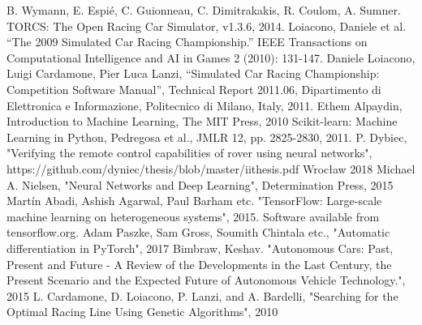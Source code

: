 \documentclass[declaration,shortabstract,english,inz]{iithesis}
\begin{document}
\begin{thebibliography}{1}
 B. Wymann, E. Espié, C. Guionneau, C. Dimitrakakis, R. Coulom, A. Sumner. TORCS: The Open Racing Car Simulator, v1.3.6, 2014.
 Loiacono, Daniele et al. “The 2009 Simulated Car Racing Championship.” IEEE Transactions on Computational Intelligence and AI in Games 2 (2010): 131-147.
 Daniele Loiacono, Luigi Cardamone, Pier Luca Lanzi, “Simulated Car
Racing Championship: Competition Software Manual”, Technical Report 2011.06, Dipartimento
di Elettronica e Informazione, Politecnico di Milano, Italy, 2011.
 Ethem Alpaydin, Introduction to Machine Learning, The MIT Press, 2010
 Scikit-learn: Machine Learning in Python, Pedregosa et al., JMLR 12, pp. 2825-2830, 2011.
 P. Dybiec, "Verifying the remote control capabilities of rover using neural networks", https://github.com/dyniec/thesis/blob/master/iithesis.pdf Wrocław 2018
 Michael A. Nielsen, "Neural Networks and Deep Learning", Determination Press, 2015
 Martín Abadi, Ashish Agarwal, Paul Barham etc.
"TensorFlow: Large-scale machine learning on heterogeneous systems",
2015. Software available from tensorflow.org.
 Adam Paszke, Sam Gross, Soumith Chintala etc., "Automatic differentiation in PyTorch", 2017
 Bimbraw, Keshav. "Autonomous Cars: Past, Present and Future - A Review of the Developments in the Last Century, the Present Scenario and the Expected Future of Autonomous Vehicle Technology.", 2015
 L. Cardamone, D. Loiacono, P. Lanzi, and A. Bardelli, "Searching for the Optimal Racing Line Using Genetic Algorithms", 2010


\end{thebibliography}
\end{document}
